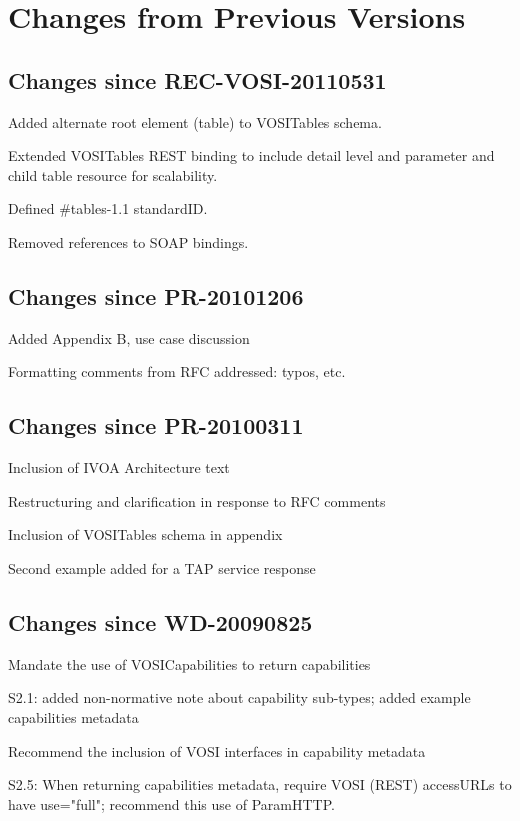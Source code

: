 \documentclass[11pt,letter]{ivoa}
\begin{document}
\section{Changes from Previous Versions}
\label{appendix:changes}

\subsection{Changes since REC-VOSI-20110531}

Added alternate root element (table) to VOSITables schema.

Extended VOSITables REST binding to include detail level and parameter
and child table resource for scalability.

Defined \#tables-1.1 standardID.

Removed references to SOAP bindings.

\subsection{Changes since PR-20101206}

Added Appendix B, use case discussion
    
Formatting comments from RFC addressed: typos, etc.

\subsection{Changes since PR-20100311}

Inclusion of IVOA Architecture text

Restructuring and clarification in response to RFC comments

Inclusion of VOSITables schema in appendix

Second example added for a TAP service response

\subsection{Changes since WD-20090825}

Mandate the use of VOSICapabilities to return capabilities

S2.1: added non-normative note about capability sub-types; added example
capabilities metadata

Recommend the inclusion of VOSI interfaces in capability metadata

S2.5: When returning capabilities metadata, require VOSI (REST)
accessURLs to have use="full"; recommend this use of ParamHTTP.
\end{document}
